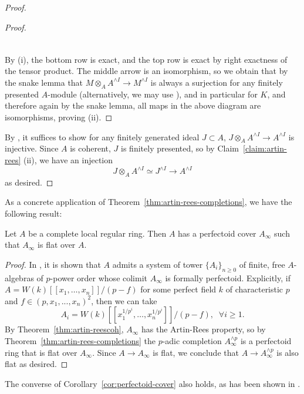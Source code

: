 \begin{proof}
\begin{proof}
\[\begin{tikzcd}
\end{tikzcd}\]
By (i), the bottom row is exact, and the top row is exact by right exactness of the tensor product. 
The middle arrow is an isomorphism, so we obtain that by the snake lemma that $M \otimes_A A^{\wedge I} \to M^{\wedge I}$ is always a surjection for any finitely presented $A$-module (alternatively,
we may use \cite[0315]{sp}), and in particular for $K$, and therefore again by the snake lemma, all maps in the above diagram are isomorphisms, proving (ii).
\end{proof}
By \cite[00HD]{sp}, it suffices to show for any finitely generated ideal $J \subset A$, $J \otimes_A A^{\wedge I} \to A^{\wedge I}$ is injective. 
Since $A$ is coherent, $J$ is finitely presented, so by Claim~\ref{claim:artin-rees} (ii), we have an injection 
\[J \otimes_A A^{\wedge I} \simeq J^{\wedge I} \to A^{\wedge I}\]
as desired.
\end{proof}
As a concrete application of Theorem~\ref{thm:artin-rees-completions}, we have the following result:
\begin{corollary}\label{cor:perfectoid-cover}
Let $A$ be a complete local regular ring. Then $A$ has a perfectoid cover $A_{\infty}$ such that $A_{\infty}$ is flat over $A$.
\end{corollary}
\begin{proof}
In \cite[Lemma 3.1.1. (b)]{purflat}, it is shown that $A$ admits a system of tower $\{A_i\}_{n\ge 0}$ of finite, 
free $A$-algebras of $p$-power order whose colimit $A_{\infty}$ is formally perfectoid. Explicitly,
if $A = W(k)[[x_1, \ldots, x_n]]/(p-f)$ for some perfect field $k$ of characteristic $p$ and $f \in (p,x_1,...,x_n)^2$, then we can take 
\[A_i = W(k)[[x_1^{1/p^i}, \ldots, x_n^{1/p^i}]]/(p-f), \; \; \forall i \ge 1.\]
By Theorem~\ref{thm:artin-reescoh}, $A_{\infty}$ has the Artin-Rees property, so by Theorem~\ref{thm:artin-rees-completions}  the $p$-adic completion $A_{\infty}^{\wedge p}$ is a perfectoid ring that is flat over $A_{\infty}$. 
Since $A \to A_{\infty}$ is flat, we conclude that $A \to A_{\infty}^{\wedge p}$ is also flat as desired.
\end{proof}
\begin{remark}
The converse of Corollary~\ref{cor:perfectoid-cover} also holds, as has been shown in \cite{padickunz}.
\end{remark}
